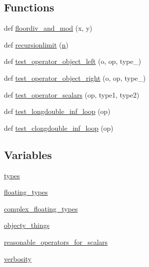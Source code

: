 \subsection*{Functions}
\begin{DoxyCompactItemize}
\item 
def \hyperlink{namespacenumpy_1_1core_1_1tests_1_1test__scalarmath_af2f696f052003a303442e7df363ba1be}{floordiv\+\_\+and\+\_\+mod} (x, y)
\item 
def \hyperlink{namespacenumpy_1_1core_1_1tests_1_1test__scalarmath_a20dc4e625d4d8ccc7bbcb19094d18bf1}{recursionlimit} (\hyperlink{namespacenumpy_a352663c52853d2754274407d5cae2832}{n})
\item 
def \hyperlink{namespacenumpy_1_1core_1_1tests_1_1test__scalarmath_a266f2887e3c01d73e570439e7b261f6d}{test\+\_\+operator\+\_\+object\+\_\+left} (o, op, type\+\_\+)
\item 
def \hyperlink{namespacenumpy_1_1core_1_1tests_1_1test__scalarmath_a1e04e36ae8c9abdd54cc6fcffad2d509}{test\+\_\+operator\+\_\+object\+\_\+right} (o, op, type\+\_\+)
\item 
def \hyperlink{namespacenumpy_1_1core_1_1tests_1_1test__scalarmath_a7991eb04379d7d338532aa318db9a671}{test\+\_\+operator\+\_\+scalars} (op, type1, type2)
\item 
def \hyperlink{namespacenumpy_1_1core_1_1tests_1_1test__scalarmath_a60eee640b9cf423943de480bb98a6a91}{test\+\_\+longdouble\+\_\+inf\+\_\+loop} (op)
\item 
def \hyperlink{namespacenumpy_1_1core_1_1tests_1_1test__scalarmath_a9033f1ade1c4205a611c5c475db77877}{test\+\_\+clongdouble\+\_\+inf\+\_\+loop} (op)
\end{DoxyCompactItemize}
\subsection*{Variables}
\begin{DoxyCompactItemize}
\item 
\hyperlink{namespacenumpy_1_1core_1_1tests_1_1test__scalarmath_a4f75e92b746481a9e766f027b650fd1b}{types}
\item 
\hyperlink{namespacenumpy_1_1core_1_1tests_1_1test__scalarmath_a004b917f1f39f5c0aeb071f68cd36cfb}{floating\+\_\+types}
\item 
\hyperlink{namespacenumpy_1_1core_1_1tests_1_1test__scalarmath_a574523b6d08d3eafa6614d4576d5196a}{complex\+\_\+floating\+\_\+types}
\item 
\hyperlink{namespacenumpy_1_1core_1_1tests_1_1test__scalarmath_aacd2421ae210af8ebb28a02b0eaff0cf}{objecty\+\_\+things}
\item 
\hyperlink{namespacenumpy_1_1core_1_1tests_1_1test__scalarmath_a43d2d8bee33b5fa958d8f7435cbe385a}{reasonable\+\_\+operators\+\_\+for\+\_\+scalars}
\item 
\hyperlink{namespacenumpy_1_1core_1_1tests_1_1test__scalarmath_ac4b7b2264fc34047bb2af321809754a1}{verbosity}
\end{DoxyCompactItemize}



